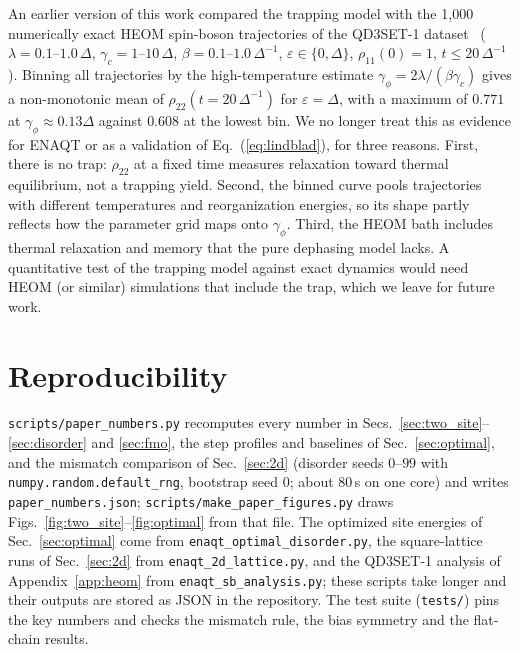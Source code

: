 \documentclass[aps,pre,preprint,floatfix]{revtex4-2}
\newcommand{\gp}{\gamma_\phi}
\begin{document}
An earlier version of this work compared the trapping model with the 1{,}000
numerically exact HEOM spin-boson trajectories of the QD3SET-1
dataset~\cite{ullah2023} ($\lambda=0.1$--$1.0\,\Delta$,
$\gamma_c=1$--$10\,\Delta$, $\beta=0.1$--$1.0\,\Delta^{-1}$,
$\varepsilon\in\{0,\Delta\}$, $\rho_{11}(0)=1$, $t\le20\,\Delta^{-1}$).
Binning all trajectories by the high-temperature estimate
$\gp=2\lambda/(\beta\gamma_c)$ gives a non-monotonic mean of
$\rho_{22}(t=20\,\Delta^{-1})$ for $\varepsilon=\Delta$, with a maximum of
$0.771$ at $\gp\approx0.13\Delta$ against $0.608$ at the lowest bin.
We no longer treat this as evidence for ENAQT or as a validation of
Eq.~(\ref{eq:lindblad}), for three reasons.
First, there is no trap: $\rho_{22}$ at a fixed time measures relaxation toward
thermal equilibrium, not a trapping yield.
Second, the binned curve pools trajectories with different temperatures and
reorganization energies, so its shape partly reflects how the parameter grid
maps onto $\gp$.
Third, the HEOM bath includes thermal relaxation and memory that the pure
dephasing model lacks.
A quantitative test of the trapping model against exact dynamics would need
HEOM (or similar) simulations that include the trap, which we leave for future
work.

\section{\label{app:repro}Reproducibility}

\texttt{scripts/paper\_numbers.py} recomputes every number in
Secs.~\ref{sec:two_site}--\ref{sec:disorder} and \ref{sec:fmo}, the step
profiles and baselines of Sec.~\ref{sec:optimal}, and the mismatch comparison
of Sec.~\ref{sec:2d} (disorder seeds $0$--$99$ with
\texttt{numpy.random.default\_rng}, bootstrap seed 0; about 80\,s on one
core) and writes \texttt{paper\_numbers.json};
\texttt{scripts/make\_paper\_figures.py} draws
Figs.~\ref{fig:two_site}--\ref{fig:optimal} from that file.
The optimized site energies of Sec.~\ref{sec:optimal} come from
\texttt{enaqt\_optimal\_disorder.py}, the square-lattice runs of
Sec.~\ref{sec:2d} from \texttt{enaqt\_2d\_lattice.py}, and the QD3SET-1
analysis of Appendix~\ref{app:heom} from \texttt{enaqt\_sb\_analysis.py}; these
scripts take longer and their outputs are stored as JSON in the repository.
The test suite (\texttt{tests/}) pins the key numbers and checks the mismatch
rule, the bias symmetry and the flat-chain results.
\end{document}
